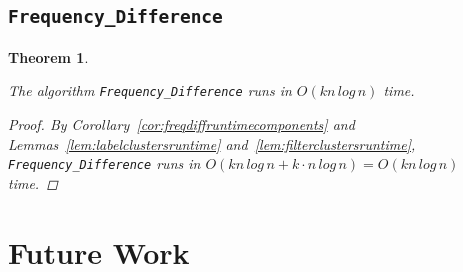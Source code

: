 \documentclass{article}
\newtheorem{freqdiffruntime}[incompatibility]{Theorem}
\begin{document}
    \subsection{\texttt{Frequency\_Difference}}

    \begin{freqdiffruntime}
        \label{theorem:freqdiffruntime}

        The algorithm \texttt{Frequency\_Difference} runs in $O(kn\,log\,n)$ time.

        \begin{proof}
            By Corollary~\ref{cor:freqdiffruntimecomponents} and Lemmas~\ref{lem:labelclustersruntime} and~\ref{lem:filterclustersruntime}, \texttt{Frequency\_Difference} runs in $O(kn\,log\,n + k \cdot n\,log\,n) = O(kn\,log\,n)$ time.
        \end{proof}
    \end{freqdiffruntime}

    \section{Future Work}
    \label{sec:futurework}

    \newpage
    
    
\end{document}
